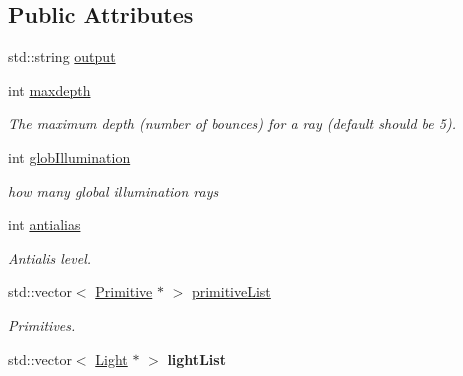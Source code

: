 \subsection*{Public Attributes}
\begin{DoxyCompactItemize}
\item 
std\+::string \mbox{\hyperlink{class_scene_a13a1664c71ce40b237e0a5de3a127357}{output}}
\item 
\mbox{\label{class_scene_a6191b1f812e96786a71c53d0c8145fd3}} 
int \mbox{\hyperlink{class_scene_a6191b1f812e96786a71c53d0c8145fd3}{maxdepth}}
\begin{DoxyCompactList}\small\item\em The maximum depth (number of bounces) for a ray (default should be 5). \end{DoxyCompactList}\item 
\mbox{\label{class_scene_ae842faf7b4068677255c57522c8b2494}} 
int \mbox{\hyperlink{class_scene_ae842faf7b4068677255c57522c8b2494}{glob\+Illumination}}
\begin{DoxyCompactList}\small\item\em how many global illumination rays \end{DoxyCompactList}\item 
\mbox{\label{class_scene_a9596e2a8193b3e1c13f3f427876496f5}} 
int \mbox{\hyperlink{class_scene_a9596e2a8193b3e1c13f3f427876496f5}{antialias}}
\begin{DoxyCompactList}\small\item\em Antialis level. \end{DoxyCompactList}\item 
\mbox{\label{class_scene_a5dbdc611abc51e326dd81d4210f946c3}} 
std\+::vector$<$ \mbox{\hyperlink{class_primitive}{Primitive}} $\ast$ $>$ \mbox{\hyperlink{class_scene_a5dbdc611abc51e326dd81d4210f946c3}{primitive\+List}}
\begin{DoxyCompactList}\small\item\em Primitives. \end{DoxyCompactList}\item 
\mbox{\label{class_scene_a23ad3b6aee4fac7a3acb9a5de0f3f8bb}} 
std\+::vector$<$ \mbox{\hyperlink{class_light}{Light}} $\ast$ $>$ {\bfseries light\+List}
\item 

\end{DoxyCompactItemize}

